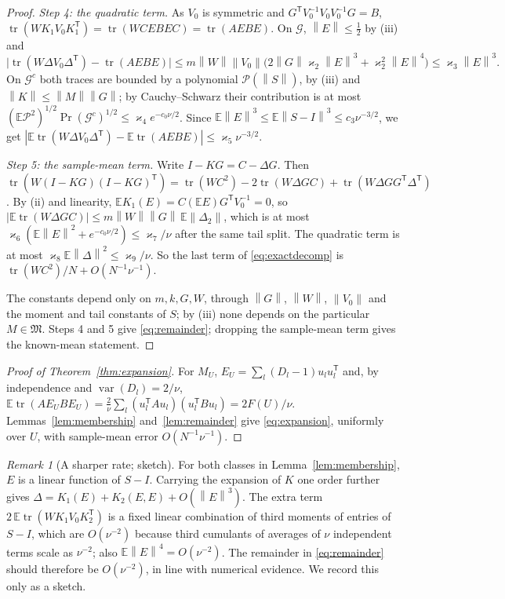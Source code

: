 \documentclass[11pt,a4paper]{article}
\numberwithin{equation}{section}
\theoremstyle{remark}\newtheorem{remark}[theorem]{Remark}
\newcommand{\E}{\mathbb E}
\newcommand{\tr}{\operatorname{tr}}
\newcommand{\var}{\operatorname{var}}
\newcommand{\T}{^{\mathsf T}}
\newcommand{\norm}[1]{\left\lVert#1\right\rVert}
\begin{document}
\begin{proof}
\emph{Step 4: the quadratic term.} As \(V_0\) is symmetric and \(G\T V_0^{-1}V_0V_0^{-1}G=B\),
\(\tr(WK_1V_0K_1\T)=\tr(WCEBEC)=\tr(AEBE)\). On \(\mathcal G\), \(\norm E\le\frac12\) by (iii) and
\[
 \bigl|\tr(W\Delta V_0\Delta\T)-\tr(AEBE)\bigr|
 \le m\norm W\norm{V_0}\bigl(2\norm G\varkappa_2\norm E^3+\varkappa_2^2\norm E^4\bigr)
 \le\varkappa_3\norm E^3 .
\]
On \(\mathcal G^c\) both traces are bounded by a polynomial \(\mathcal P(\norm S)\), by (iii) and
\(\norm K\le\norm M\norm G\); by Cauchy--Schwarz their contribution is at most
\((\E\mathcal P^2)^{1/2}\Pr(\mathcal G^c)^{1/2}\le\varkappa_4e^{-c_0\nu/2}\). Since
\(\E\norm E^3\le\E\norm{S-I}^3\le c_3\nu^{-3/2}\), we get
\(|\E\tr(W\Delta V_0\Delta\T)-\E\tr(AEBE)|\le\varkappa_5\nu^{-3/2}\).

\emph{Step 5: the sample-mean term.} Write \(I-KG=C-\Delta G\). Then
\(\tr(W(I-KG)(I-KG)\T)=\tr(WC^2)-2\tr(W\Delta GC)+\tr(W\Delta GG\T\Delta\T)\). By (ii) and
linearity, \(\E K_1(E)=C(\E E)G\T V_0^{-1}=0\), so
\(|\E\tr(W\Delta GC)|\le m\norm W\norm G\,\E\norm{\Delta_2}\), which is at most
\(\varkappa_6(\E\norm E^2+e^{-c_0\nu/2})\le\varkappa_7/\nu\) after the same tail split. The quadratic
term is at most \(\varkappa_8\E\norm\Delta^2\le\varkappa_9/\nu\). So the last term of
\eqref{eq:exactdecomp} is \(\tr(WC^2)/N+O(N^{-1}\nu^{-1})\).

The constants depend only on \(m,k,G,W\), through \(\norm G\), \(\norm W\), \(\norm{V_0}\) and the
moment and tail constants of \(S\); by (iii) none depends on the particular \(M\in\mathfrak M\).
Steps 4 and 5 give \eqref{eq:remainder}; dropping the sample-mean term gives the known-mean
statement.
\end{proof}

\begin{proof}[Proof of Theorem~\ref{thm:expansion}]
For \(M_U\), \(E_U=\sum_l(D_l-1)u_lu_l\T\) and, by independence and \(\var(D_l)=2/\nu\),
\(\E\tr(AE_UBE_U)=\frac2\nu\sum_l(u_l\T Au_l)(u_l\T Bu_l)=2F(U)/\nu\). Lemmas~\ref{lem:membership}
and~\ref{lem:remainder} give \eqref{eq:expansion}, uniformly over \(U\), with sample-mean error
\(O(N^{-1}\nu^{-1})\).
\end{proof}

\begin{remark}[A sharper rate; sketch]\label{rem:sharper}
For both classes in Lemma~\ref{lem:membership}, \(E\) is a linear function of \(S-I\). Carrying
the expansion of \(K\) one order further gives \(\Delta=K_1(E)+K_2(E,E)+O(\norm E^3)\). The extra
term \(2\,\E\tr(WK_1V_0K_2\T)\) is a fixed linear combination of third moments of entries of
\(S-I\), which are \(O(\nu^{-2})\) because third cumulants of averages of \(\nu\) independent terms
scale as \(\nu^{-2}\); also \(\E\norm E^4=O(\nu^{-2})\). The remainder in \eqref{eq:remainder} should
therefore be \(O(\nu^{-2})\), in line with numerical evidence. We record this only as a sketch.
\end{remark}
\end{document}
